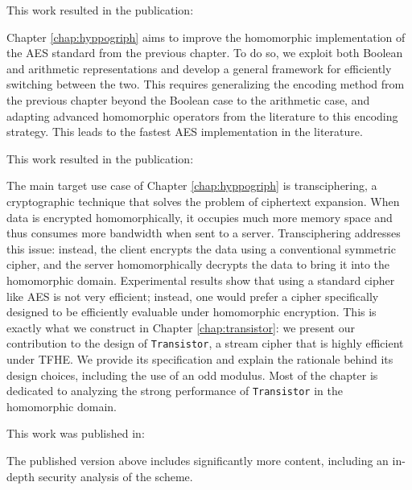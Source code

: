 This work resulted in the publication:

\begin{center}
\end{center}

Chapter \ref{chap:hyppogriph} aims to improve the homomorphic implementation of the \gls{AES} standard from the previous chapter. To do so, we exploit both Boolean and arithmetic representations and develop a general framework for efficiently switching between the two. This requires generalizing the encoding method from the previous chapter beyond the Boolean case to the arithmetic case, and adapting advanced homomorphic operators from the literature to this encoding strategy. This leads to the fastest \gls{AES} implementation in the literature.

This work resulted in the publication:

\begin{center}
\end{center}

The main target use case of Chapter \ref{chap:hyppogriph} is transciphering, a cryptographic technique that solves the problem of ciphertext expansion. When data is encrypted homomorphically, it occupies much more memory space and thus consumes more bandwidth when sent to a server. Transciphering addresses this issue: instead, the client encrypts the data using a conventional symmetric cipher, and the server homomorphically decrypts the data to bring it into the homomorphic domain. Experimental results show that using a standard cipher like \gls{AES} is not very efficient; instead, one would prefer a cipher specifically designed to be efficiently evaluable under homomorphic encryption. This is exactly what we construct in Chapter \ref{chap:transistor}: we present our contribution to the design of \texttt{Transistor}, a stream cipher that is highly efficient under \gls{TFHE}. We provide its specification and explain the rationale behind its design choices, including the use of an odd modulus. Most of the chapter is dedicated to analyzing the strong performance of \texttt{Transistor} in the homomorphic domain.

This work was published in:

\begin{center}
\end{center}

The published version above includes significantly more content, including an in-depth security analysis of the scheme.

